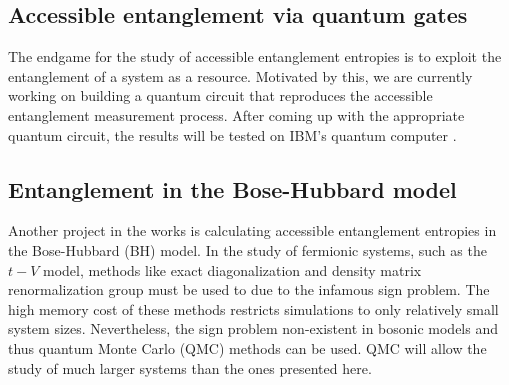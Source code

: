 	\subsection{Accessible entanglement via quantum gates}
	
	The endgame for the study of accessible entanglement entropies is to exploit the entanglement of a system as a resource. Motivated by this, we are currently working on building a quantum circuit that reproduces the accessible entanglement measurement process. After coming up with the appropriate quantum circuit, the results will be tested on IBM's quantum computer \cite{IBMQuantumExp:2018:Online}.
	
	\subsection{Entanglement in the Bose-Hubbard model}
	
	Another project in the works is calculating accessible entanglement entropies in the Bose-Hubbard (BH) model. In the study of fermionic systems, such as the $t-V$ model, methods like exact diagonalization and density matrix renormalization group must be used to due to the infamous sign problem. The high memory cost of these methods restricts simulations to only relatively small system sizes. Nevertheless, the sign problem non-existent in bosonic models and thus quantum Monte Carlo (QMC) methods can be used. QMC will allow the study of much larger systems than the ones presented here.